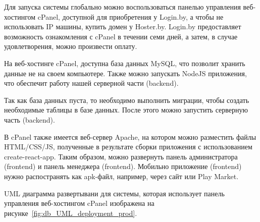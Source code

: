 

Для запуска системы глобально можно воспользоваться панелью управления веб-хостингом cPanel,
доступной для приобретения у Login.by, а чтобы не использовать IP машины, купить домен у Hoster.by.
Login.by предоставляет возможность ознакомления с cPanel в течении семи дней,
а затем, в случае удовлетворения, можно произвести оплату.

На веб-хостинге cPanel, доступна база данных MySQL, что позволит хранить данные не на своем компьютере.
Также можно запускать NodeJS приложения, что обеспечит работу нашей серверной части (backend).

Так как база данных пуста, то необходимо выполнить миграции, чтобы создать необходимые таблицы в базе данных.
После этого можно запустить серверную часть (backend).

В cPanel также имеется веб-сервер Apache, на котором можно разместить файлы HTML/CSS/JS,
полученные в результате сборки приложения с использованием create-react-app.
Таким образом, можно развернуть панель администратора (frontend) и панель менеджера (frontend).
Мобильно приложение (frontend) нужно распостранять как apk-файл, например, через сайт или Play Market.

UML диаграмма развертывани для системы,
которая использует панель управления веб-хостингом cPanel изображена на рисунке~\ref{fig:db_UML_deployment_prod}.




